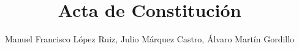\documentclass[a4paper,10pt]{article}
\title{Acta de Constitución}
\author{Manuel Francisco López Ruiz, Julio Márquez Castro, Álvaro Martín Gordillo}
\begin{document}
\maketitle


\medskip


\end{document}

